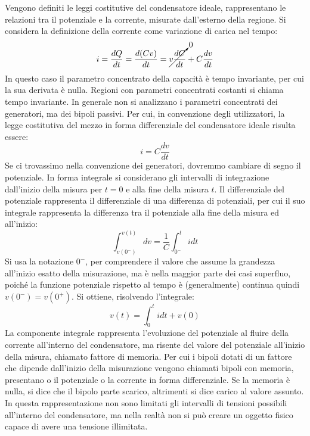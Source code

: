 \documentclass{article}
\numberwithin{equation}{subsection}
\begin{document}
Vengono definiti le leggi costitutive del condensatore ideale, rappresentano le relazioni tra il potenziale e la corrente, misurate dall'esterno della regione. 
Si considera la definizione della corrente come variazione di carica nel tempo:
\begin{equation*}
    i=\displaystyle\frac{dQ}{dt}=\frac{d(Cv)}{dt}=\cancelto{0}{v\frac{dC}{dt}}+C\frac{dv}{dt}
\end{equation*}
In questo caso il parametro concentrato della capacità è tempo invariante, per cui la sua derivata è nulla. Regioni con parametri concentrati costanti si chiama tempo 
invariante. In generale non si analizzano i parametri concentrati dei generatori, ma dei bipoli passivi. Per cui, in convenzione degli utilizzatori, la legge costitutiva del 
mezzo in forma differenziale del condensatore ideale risulta essere:
\begin{equation}
    i=\displaystyle C\frac{dv}{dt}
\end{equation}
Se ci trovassimo nella convenzione dei generatori, dovremmo cambiare di segno il potenziale. In forma integrale si considerano gli intervalli di integrazione dall'inizio 
della misura per $t=0$ e alla fine della misura $t$. Il differenziale del potenziale rappresenta il differenziale di una differenza di potenziali, per cui il suo integrale rappresenta la differenza tra il potenziale alla fine della misura ed all'inizio:
\begin{equation*}
    \displaystyle\int_{v(0^-)}^{v(t)}dv=\frac{1}{C}\int_{0^-}^tidt
\end{equation*}
Si usa la notazione $0^-$, per comprendere il valore che assume la grandezza all'inizio esatto della misurazione, ma è nella maggior parte dei casi superfluo, poiché la funzione 
potenziale rispetto al tempo è (generalmente) continua quindi $v(0^-)=v(0^+)$. Si ottiene, risolvendo l'integrale:
\begin{equation*}
    v(t)=\displaystyle\int_0^tidt+v(0)
\end{equation*}
La componente integrale rappresenta l'evoluzione del potenziale al fluire della corrente all'interno del condensatore, ma risente del valore del potenziale all'inizio della misura, 
chiamato fattore di memoria. Per cui i bipoli dotati di un fattore che dipende dall'inizio della misurazione vengono chiamati bipoli con memoria, presentano o il potenziale 
o la corrente in forma differenziale. Se la memoria è nulla, si dice che il bipolo parte scarico, altrimenti si dice carico al valore assunto. In questa rappresentazione non 
sono limitati gli intervalli di tensioni possibili all'interno del condensatore, ma nella realtà non si può creare un oggetto fisico capace di avere una tensione illimitata. 
\end{document}
